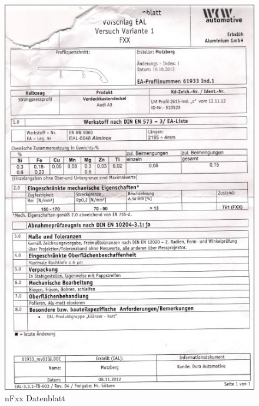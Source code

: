 \documentclass[12pt,a4paper,parskip]{scrartcl}
\begin{document}
\begin{figure}[hbtp]
\centering
\includegraphics[width=1\textwidth]{nFxxDatenblatt.jpg}
\caption{nFxx Datenblatt}
\end{figure}
\end{document}
